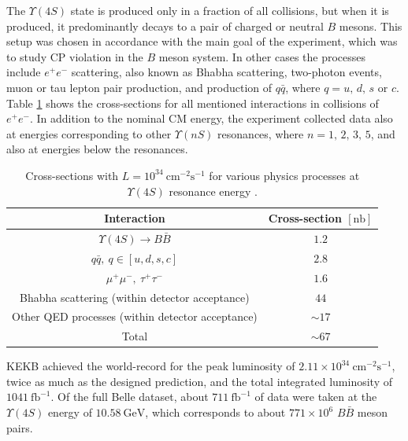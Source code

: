 \documentclass[headings=standardclasses,headings=big,oneside,a4paper,openany,12pt]{scrbook}
\newcommand {\e}[1]{\mathrm{~#1}}
\newcommand {\E}[1]{\times 10^{#1}}
\begin{document}
The $\Upsilon(4S)$ state is produced only in a fraction of all collisions, but when it is produced, it predominantly decays to a pair of charged or neutral $B$ mesons. This setup was chosen in accordance with the main goal of the experiment, which was to study CP
violation in the $B$ meson system. In other cases the processes include $e^+e^-$ scattering, also known as Bhabha scattering, two-photon events, muon or tau lepton pair production, and production of $q \bar q$, where $q=u,\,d,\,s$ or $c$. Table \ref{tab:xsec} shows the cross-sections for all mentioned interactions in collisions of $e^+e^-$.
In addition to the nominal CM energy, the experiment collected data also at energies
corresponding to other $\Upsilon(nS)$ resonances, where $n = 1,\,2,\,3,\,5$, and also at energies below the resonances.

\begin{table}[H]
\centering
	\begin{tabular}{|c|c|}
	\hline
	Interaction & Cross-section $[\mathrm{nb}]$ \\ 
	\hline
	$\Upsilon(4S) \to B \bar B$ & $1.2$ \\
	$q \bar q,~q \in [u,d,s,c]$ & $2.8$ \\
	$\mu^+\mu^-,~\tau^+\tau^-$ & $1.6$ \\
	Bhabha scattering (within detector acceptance)& $44$ \\
	Other QED processes (within detector acceptance)& $\sim 17$ \\
	\hline
	Total & $\sim 67$ \\
	\hline
\end{tabular}
\caption{Cross-sections with $L=10^{34}\e{cm^{-2}s^{-1}}$ for various physics processes at $\Upsilon(4S)$ resonance energy \cite{ABASHIAN2002117}.}
\label{tab:xsec}
\end{table}

KEKB achieved the world-record for the peak luminosity of $2.11\E{34}\e{cm^{-2}s^{-1}}$, twice as much as the designed prediction, and the total integrated luminosity of $1041\e{fb^{-1}}$. Of the full Belle dataset, about $711\e{fb^{-1}}$ of data were taken at the $\Upsilon(4S)$ energy of $10.58\e{GeV}$, which corresponds to about $771\E{6}$ $B \bar B$ meson pairs.
\end{document}
